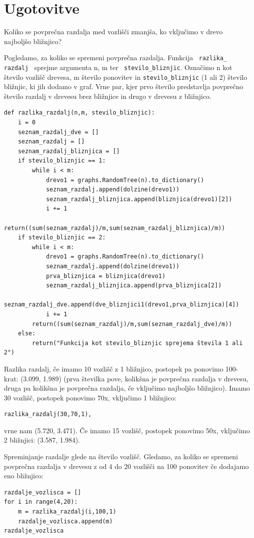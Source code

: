 \documentclass[a4paper,10pt]{article}
\begin{document}
\section{Ugotovitve}
 Koliko se povprečna razdalja med vozlišči zmanjša, ko vključimo v drevo najboljšo bližnjico?
\newline

Pogledamo, za koliko se spremeni povprečna razdalja. Funkcija \texttt{ razlika\_ razdalj } sprejme argumenta n, m ter \texttt{ stevilo\_bliznjic}. Označimo n kot število vozlišč drevesa, m število ponovitev in \texttt{stevilo\_bliznjic} (1 ali 2) število bližnjic, ki jih dodamo v graf. Vrne par, kjer prvo število predstavlja povprečno število razdalj v drevesu brez bližnjice in drugo v drevesu z bližnjico. 
\begin{verbatim}
def razlika_razdalj(n,m, stevilo_bliznjic):
    i = 0
    seznam_razdalj_dve = []
    seznam_razdalj = []
    seznam_razdalj_bliznjica = []
    if stevilo_bliznjic == 1:
        while i < m:
            drevo1 = graphs.RandomTree(n).to_dictionary()
            seznam_razdalj.append(dolzine(drevo1))
            seznam_razdalj_bliznjica.append(bliznjica(drevo1)[2])
            i += 1
        return((sum(seznam_razdalj)/m,sum(seznam_razdalj_bliznjica)/m))
    if stevilo_bliznjic == 2:
        while i < m:
            drevo1 = graphs.RandomTree(n).to_dictionary()
            seznam_razdalj.append(dolzine(drevo1))
            prva_bliznjica = bliznjica(drevo1)
            seznam_razdalj_bliznjica.append(prva_bliznjica[2])
            seznam_razdalj_dve.append(dve_bliznjici1(drevo1,prva_bliznjica)[4])
            i += 1
        return((sum(seznam_razdalj)/m,sum(seznam_razdalj_dve)/m))
    else:
        return("Funkcija kot stevilo_bliznjic sprejema števila 1 ali 2")
\end{verbatim}

Razlika razdalj, če imamo 10 vozlišč z 1 bližnjico, postopek pa ponovimo 100-krat:  (3.099, 1.989) (prva številka pove, kolikšna je povprečna razdalja v drevesu, druga pa kolikšna je povprečna razdalja, če vključimo najboljšo bližnjico).
\newline
Imamo 30 vozlišč, postopek ponovimo 70x, vključimo 1 bližnjico:
\begin{verbatim}
razlika_razdalj(30,70,1),
\end{verbatim}
vrne nam (5.720, 3.471).
Če imamo 15 vozlišč, postopek ponovimo 50x, vključimo 2  bližnjici: (3.587, 1.984).

Spreminjanje razdalje glede na število vozlišč. Gledamo, za koliko se spremeni povprečna razdalja v drevesu z od 4 do 20 vozlišči na 100 ponovitev če dodajamo eno bližnjico:
\begin{verbatim}
razdalje_vozlisca = []
for i in range(4,20):
    m = razlika_razdalj(i,100,1)
    razdalje_vozlisca.append(m)
razdalje_vozlisca
\end{verbatim}
\end{document}
